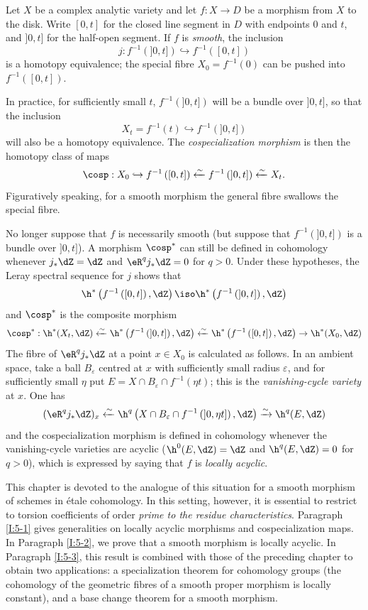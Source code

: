 Let $X$ be a complex analytic variety and let $f:X\to D$ be a morphism
from $X$ to the disk. Write $[0,t]$ for the closed line segment in $D$
with endpoints $0$ and $t$, and $]0,t]$ for the half-open segment. If
$f$ is \emph{smooth}, the inclusion
\[
  j : f^{-1}\left(]0,t]\right) \hookrightarrow f^{-1}\left([0,t]\right)
\]
is a homotopy equivalence; the special fibre
$X_0=f^{-1}(0)$ can be pushed into $f^{-1}([0,t])$.

In practice, for sufficiently small $t$, $f^{-1}(]0,t])$ will be a
bundle over $]0,t]$, so that the inclusion
\[
  X_t = f^{-1}(t) \hookrightarrow f^{-1}\left(]0,t]\right)
\]
will also be a homotopy equivalence. The \emph{cospecialization morphism}
is then the homotopy class of maps
\[
  \cosp : X_0 \hookrightarrow f^{-1}\left([0,t]\right) \xleftarrow\sim f^{-1}\left(]0,t]\right) \xleftarrow\sim X_t \text{.}
\]
Figuratively speaking,
for a smooth morphism the general fibre swallows the special fibre.

No longer suppose that $f$ is necessarily smooth (but suppose that
$f^{-1}(]0,t])$ is a bundle over $]0,t]$). A morphism
$\cosp^*$ can still be defined in cohomology whenever
$j_*\dZ=\dZ$ and $\eR^qj_*\dZ=0$ for $q>0$. Under these hypotheses,
the Leray spectral sequence for $j$ shows that
\[
  \h^*\left(f^{-1}\left([0,t]\right),\dZ\right) \iso \h^*\left(f^{-1}\left(]0,t]\right),\dZ\right)
\]
and $\cosp^*$ is the composite morphism
\[
  \cosp^* : \h^*(X_t,\dZ)
    \xleftarrow\sim \h^*\left(f^{-1}\left(]0,t]\right),\dZ\right)
    \xleftarrow\sim \h^*\left(f^{-1}\left([0,t]\right),\dZ\right)
    \to \h^*(X_0,\dZ)
\]
The fibre of $\eR^qj_*\dZ$ at a point $x\in X_0$ is calculated as
follows. In an ambient space, take a ball $B_\varepsilon$ centred at $x$
with sufficiently small radius $\varepsilon$, and for sufficiently small
$\eta$ put $E=X\cap B_\varepsilon\cap f^{-1}(\eta t)$; this is the
\emph{vanishing-cycle variety} at $x$. One has
\[
  (\eR^q j_* \dZ)_x \xleftarrow\sim \h^q\left(X\cap B_\varepsilon\cap f^{-1}\left(]0,\eta t]\right),\dZ\right) \xrightarrow\sim \h^q(E,\dZ)
\]
and the cospecialization morphism is defined in cohomology whenever the
vanishing-cycle varieties are acyclic
($\h^0(E,\dZ)=\dZ$ and $\h^q(E,\dZ)=0$ for $q>0$), which is expressed
by saying that $f$ is \emph{locally acyclic}.

This chapter is devoted to the analogue of this situation for a smooth
morphism of schemes in étale cohomology. In this setting, however, it is
essential to restrict to torsion coefficients of order \emph{prime to the
residue characteristics}. Paragraph \ref{I:5-1} gives generalities on
locally acyclic morphisms and cospecialization maps. In Paragraph
\ref{I:5-2}, we prove that a smooth morphism is locally acyclic. In
Paragraph \ref{I:5-3}, this result is combined with those of the preceding
chapter to obtain two applications: a specialization theorem for
cohomology groups (the cohomology of the geometric fibres of a smooth
proper morphism is locally constant), and a base change theorem for a
smooth morphism.

